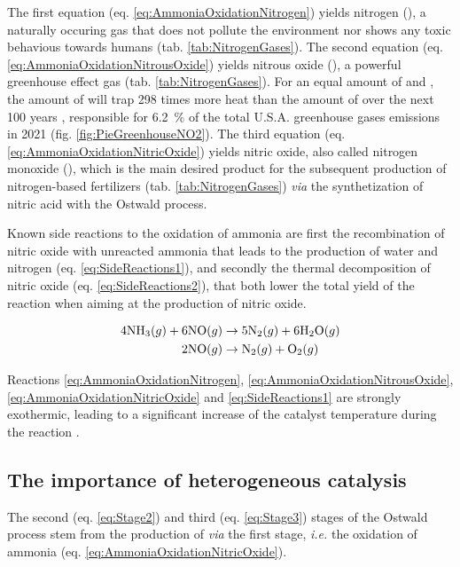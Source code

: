 The first equation (eq. \ref{eq:AmmoniaOxidationNitrogen}) yields nitrogen (\nitrogen), a naturally occuring gas that does not pollute the environment nor shows any toxic behavious towards humans (tab. \ref{tab:NitrogenGases}).
The second equation (eq. \ref{eq:AmmoniaOxidationNitrousOxide}) yields nitrous oxide (\nitrousoxide), a powerful greenhouse effect gas (tab. \ref{tab:NitrogenGases}).
For an equal amount of \nitrousoxide and \carbondioxide, the amount of \nitrousoxide will trap 298 times more heat than the amount of \carbondioxide over the next 100 years \parencite{MITCLIMATE}, responsible for \qty{6.2}{\percent} of the total U.S.A. greenhouse gases emissions in 2021 (fig. \ref{fig:PieGreenhouseNO2}).
The third equation (eq. \ref{eq:AmmoniaOxidationNitricOxide}) yields nitric oxide, also called nitrogen monoxide (\nitricoxide), which is the main desired product for the subsequent production of nitrogen-based fertilizers (tab. \ref{tab:NitrogenGases}) \textit{via} the synthetization of nitric acid with the Ostwald process.

Known side reactions to the oxidation of ammonia are first the recombination of nitric oxide with unreacted ammonia that leads to the production of water and nitrogen (eq. \ref{eq:SideReactions1}), and secondly the thermal decomposition of nitric oxide (eq. \ref{eq:SideReactions2}), that both lower the total yield of the reaction when aiming at the production of nitric oxide.

\begin{align}
    \label{eq:SideReactions1}
    4 \ammonia (g) + 6 \nitricoxide (g) & \rightarrow 5 \nitrogen (g) + 6 \water (g)\\
    \label{eq:SideReactions2}
    2 \nitricoxide (g) & \rightarrow \nitrogen (g) + \dioxygen (g)
\end{align}

Reactions \ref{eq:AmmoniaOxidationNitrogen}, \ref{eq:AmmoniaOxidationNitrousOxide}, \ref{eq:AmmoniaOxidationNitricOxide} and \ref{eq:SideReactions1} are strongly exothermic, leading to a significant increase of the catalyst temperature during the reaction \parencite{Hatscher2008}.


\subsection{The importance of heterogeneous catalysis}

The second (eq. \ref{eq:Stage2}) and third (eq. \ref{eq:Stage3}) stages of the Ostwald process stem from the production of \nitricoxide \textit{via} the first stage, \textit{i.e.} the oxidation of ammonia (eq. \ref{eq:AmmoniaOxidationNitricOxide}).

